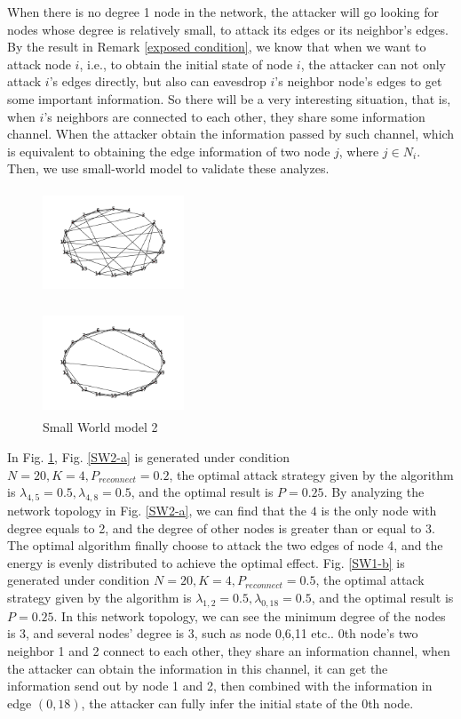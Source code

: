 \documentclass[10pt,journal,compsoc]{IEEEtran}
\begin{document}
 When there is no degree 1 node in the network, the attacker will go looking for nodes whose degree is relatively small, to attack its edges or its neighbor's edges. By the result in Remark \ref{exposed condition}, we know that when we want to attack node $i$, i.e., to obtain the initial state of node $i$, the attacker can not only attack $i$'s edges directly, but also can eavesdrop $i$'s neighbor node's edges to get some important information. So there will be a very interesting situation, that is, when $i$'s neighbors are connected to each other, they share some information channel. When the attacker obtain the information passed by such channel, which is equivalent to obtaining the edge information of two node $j$, where $j\in N_{i}$. Then, we use small-world model to validate these analyzes.
\begin{figure}[!htb]
 \parbox[b]{.25\textwidth}{\centering
 \includegraphics[width=4.2cm, height = 3.1cm]{k4p5-a}
 \subcaption{}\label{SW2-a}}%
 \parbox[b]{.25\textwidth}{\centering
 \includegraphics[width=4.2cm, height= 3.1cm]{k4p2}
 \subcaption{}}
 \caption{Small World model 2}
 \label{figSW2}
\end{figure}

In Fig. \ref{figSW2}, Fig. \ref{SW2-a} is generated under condition $N=20,K=4,P_{reconnect}=0.2$, the optimal attack strategy given by the algorithm is $\lambda_{4,5}=0.5,\lambda_{4,8}=0.5$, and the optimal result is $P=0.25$. By analyzing the network topology in Fig. \ref{SW2-a}, we can find that the $4$ is the only node with degree equals to 2, and the degree of other nodes is greater than or equal to 3. The optimal algorithm finally choose to attack the two edges of node 4, and the energy is evenly distributed to achieve the optimal effect. Fig. \ref{SW1-b} is generated under condition $N=20,K=4,P_{reconnect}=0.5$, the optimal attack strategy given by the algorithm is $\lambda_{1,2}=0.5,\lambda_{0,18}=0.5$, and the optimal result is $P=0.25$. In this network topology, we can see the minimum degree of the nodes is 3, and several nodes' degree is 3, such as node 0,6,11 etc.. 0th node's two neighbor 1 and 2 connect to each other, they share an information channel, when the attacker can obtain the information in this channel, it can get the information send out by node 1 and 2, then combined with the information in edge $(0,18)$, the attacker can fully infer the initial state of the 0th node.
\end{document}
